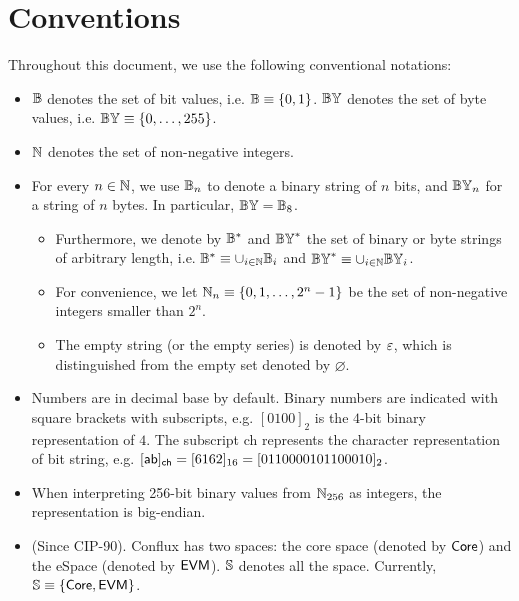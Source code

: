 
\section{Conventions}

Throughout this document, we use the following conventional notations:  
\begin{itemize}[nosep]
	\item $\mathbb{B}$ denotes the set of bit values, i.e. $\mathbb{B}\equiv  \{ 0, 1 \} $. 
	$\mathbb{BY}$ denotes the set of byte values, i.e. $\mathbb{BY}\equiv {\left \{{0,\dots,255} \right \}}$.

	\item $\mathbb{N}$ denotes the set of non-negative integers. 


	\item For every $n\in \mathbb{N}$, we use $\mathbb{B}_n$ to denote a binary string of $n$ bits, and $\mathbb{BY}_n$ for a string of $n$ bytes. In particular, $\mathbb{BY}=\mathbb{B}_8$.
	
	\begin{itemize}
		\item Furthermore, we denote by $\mathbb{B}^*$ and $\mathbb{BY}^*$ the set of binary or byte strings of arbitrary length, i.e. $\mathbb{B}^*\equiv \cup_{i\in\mathbb{N}} \mathbb{B}_i$ and $\mathbb{BY}^*\equiv \cup_{i\in\mathbb{N}} \mathbb{BY}_i$. 
	
		\item For convenience, we let $\mathbb{N}_{n}\equiv{\left \{{0,1,\dots, 2^n-1} \right \}}$  be the set of non-negative integers smaller than $2^n$.

		\item The empty string (or the empty series) is denoted by $\mathbb{\varepsilon}$, which is distinguished from the empty set denoted by $\varnothing$.
	\end{itemize}

	\item Numbers are in decimal base by default. Binary numbers are indicated with square brackets with subscripts, e.g. $[0100]_2$ is the $4$-bit binary representation of $4$. The subscript \textsf{ch} represents the character representation of bit string, e.g. $[{\sf ab}]_{\sf ch}=[6162]_{16}=[0110000101100010]_2$.

	\item When interpreting 256-bit binary values from $\mathbb{N}_{256}$ as integers, the representation is big-endian.
	
	\item (Since CIP-90). Conflux has two spaces: the core space (denoted by $\sf Core$) and the eSpace (denoted by $\sf EVM$). $\mathbb{S}$ denotes all the space. Currently, $\mathbb{S}\equiv\{\mathsf{Core},\mathsf{EVM}\}$. 


\end{itemize}
